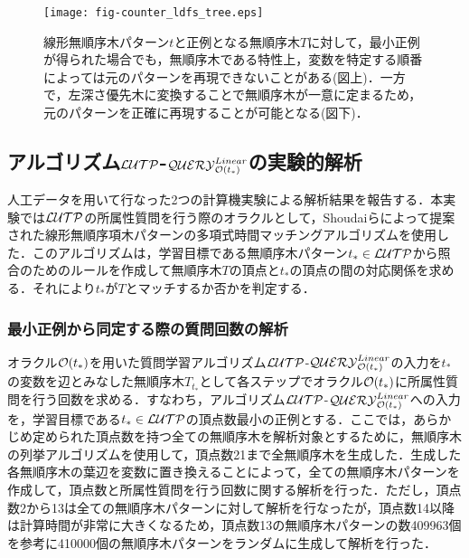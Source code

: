 \begin{figure*}[tb]
  \centering
  \texttt{[image: fig-counter\_ldfs\_tree.eps]}
  \caption{線形無順序木パターン$t$と正例となる無順序木$T$に対して，最小正例が得られた場合でも，無順序木である特性上，変数を特定する順番によっては元のパターンを再現できないことがある(図上)．一方で，左深さ優先木に変換することで無順序木が一意に定まるため，元のパターンを正確に再現することが可能となる(図下)．}\label{fig:counter_ldfs_tree}
\end{figure*}

\subsection{アルゴリズム${\cal LUTP}$-${\cal QUERY}_{{\cal O}(t_{\ast})}^{Linear}$の実験的解析}
人工データを用いて行なった2つの計算機実験による解析結果を報告する．本実験では${\cal LUTP}$の所属性質問を行う際のオラクルとして，Shoudaiら\cite{shoudai-ieice2018}によって提案された線形無順序項木パターンの多項式時間マッチングアルゴリズムを使用した．このアルゴリズムは，学習目標である無順序木パターン$t_\ast\in{\cal LUTP}$から照合のためのルールを作成して無順序木$T$の頂点と$t_\ast$の頂点の間の対応関係を求める．それにより$t_\ast$が$T$とマッチするか否かを判定する．

\subsubsection{最小正例から同定する際の質問回数の解析} \label{qltimes_input_min}
オラクル${\cal O}(t_\ast)$を用いた質問学習アルゴリズム${\cal LUTP}$-${\cal QUERY}_{{\cal O}(t_{\ast})}^{Linear}$の入力を$t_\ast$の変数を辺とみなした無順序木$T_{t_\ast}$として各ステップでオラクル${\cal O}(t_\ast)$に所属性質問を行う回数を求める．すなわち，アルゴリズム${\cal LUTP}$-${\cal QUERY}_{{\cal O}(t_{\ast})}^{Linear}$への入力を，学習目標である$t_\ast\in{\cal LUTP}$の頂点数最小の正例とする．ここでは，あらかじめ定められた頂点数を持つ全ての無順序木を解析対象とするために，無順序木の列挙アルゴリズム\cite{nii-nakano_uno2003,cs-nakano_uno2004}を使用して，頂点数21まで全無順序木を生成した．生成した各無順序木の葉辺を変数に置き換えることによって，全ての無順序木パターンを作成して，頂点数と所属性質問を行う回数に関する解析を行った．ただし，頂点数2から13は全ての無順序木パターンに対して解析を行なったが，頂点数14以降は計算時間が非常に大きくなるため，頂点数13の無順序木パターンの数409963個を参考に410000個の無順序木パターンをランダムに生成して解析を行った．

